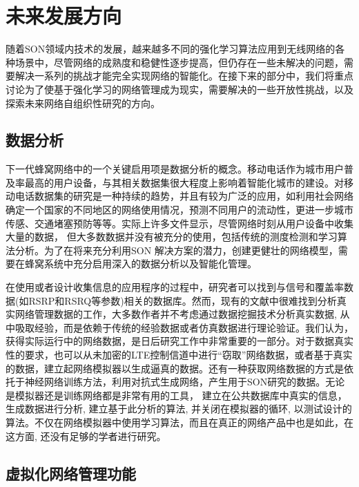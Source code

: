 \documentclass{IEEEtran}
\begin{document}
\section{未来发展方向}
\label{sec:FutureWork}


随着SON领域内技术的发展，越来越多不同的强化学习算法应用到无线网络的各种场景中，尽管网络的成熟度和稳健性逐步提高，但仍存在一些未解决的问题，需要解决一系列的挑战才能完全实现网络的智能化。在接下来的部分中，我们将重点讨论为了使基于强化学习的网络管理成为现实，需要解决的一些开放性挑战，以及探索未来网络自组织性研究的方向。

\subsection{数据分析}

下一代蜂窝网络中的一个关键启用项是数据分析的概念。移动电话作为城市用户普及率最高的用户设备，与其相关数据集很大程度上影响着智能化城市的建设。对移动电话数据集的研究是一种持续的趋势，并且有较为广泛的应用，如利用社会网络确定一个国家的不同地区的网络使用情况，预测不同用户的流动性，更进一步城市传感、交通堵塞预防等等。实际上许多文件显示，尽管网络时刻从用户设备中收集大量的数据， 但大多数数据并没有被充分的使用，包括传统的测度检测和学习算法分析。为了在将来充分利用SON 解决方案的潜力，创建更健壮的网络模型，需要在蜂窝系统中充分启用深入的数据分析以及智能化管理。

在使用或者设计收集信息的应用程序的过程中，研究者可以找到与信号和覆盖率数据(如RSRP和RSRQ等参数)相关的数据库。然而，现有的文献中很难找到分析真实网络管理数据的工作，大多数作者并不考虑通过数据挖掘技术分析真实数据, 从中吸取经验，而是依赖于传统的经验数据或者仿真数据进行理论验证。我们认为，获得实际运行中的网络数据，是日后研究工作中非常重要的一部分。对于数据真实性的要求，也可以从未加密的LTE控制信道中进行“窃取”网络数据，或者基于真实的数据，建立起网络模拟器以生成逼真的数据。还有一种获取网络数据的方式是依托于神经网络训练方法，利用对抗式生成网络，产生用于SON研究的数据。无论是模拟器还是训练网络都是非常有用的工具， 建立在公共数据库中真实的信息， 生成数据进行分析, 建立基于此分析的算法, 并关闭在模拟器的循环, 以测试设计的算法。不仅在网络模拟器中使用学习算法，而且在真正的网络产品中也是如此，在这方面, 还没有足够的学者进行研究。

\subsection{虚拟化网络管理功能}
\end{document}
